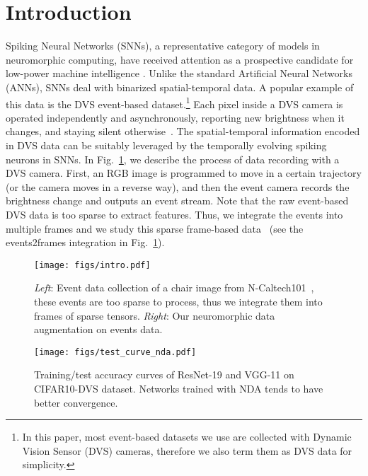 \documentclass[runningheads]{llncs}
\begin{document}
\section{Introduction}
\label{sec:intro}

Spiking Neural Networks (SNNs), a representative category of models in neuromorphic computing, have received attention as a prospective candidate for low-power machine intelligence \cite{roy2019towards}. Unlike the standard Artificial Neural Networks (ANNs), SNNs deal with binarized spatial-temporal data. A popular example of this data is the DVS event-based dataset.\footnote{In this paper, most event-based datasets we use are collected with Dynamic Vision Sensor (DVS) cameras, therefore we also term them as DVS data for simplicity.} Each pixel inside a DVS camera is operated independently and asynchronously, reporting new brightness when it changes, and staying silent otherwise~\cite{Eventcamera}.
The spatial-temporal information encoded in DVS data can be suitably leveraged by the temporally evolving spiking neurons in SNNs.
In Fig.~\ref{fig_intro}, we describe the process of data recording with a DVS camera.
First, an RGB image is programmed to move in a certain trajectory (or the camera moves in a reverse way), and then the event camera records the brightness change and outputs an event stream. Note that the raw event-based DVS data is too sparse to extract features. Thus, we integrate the events into multiple frames and we study this sparse frame-based data~\cite{wu2018spatio} (see the events2frames integration in Fig.~\ref{fig_intro}). 



\begin{figure}[t]
    \centering
    \texttt{[image: figs/intro.pdf]}
    \caption{\textit{Left}: Event data collection of a chair image from N-Caltech101~\cite{orchard2015converting}, these events are too sparse to process, thus we integrate them into frames of sparse tensors. \textit{Right}: Our neuromorphic data augmentation on events data.}
    \label{fig_intro}
\end{figure}
\begin{figure}[t]
    \centering
    \texttt{[image: figs/test\_curve\_nda.pdf]}
    \caption{Training/test accuracy curves of ResNet-19 and VGG-11 on CIFAR10-DVS dataset. Networks trained with NDA tends to have better convergence.}
    \label{fig_train_test}
\end{figure}
\end{document}

